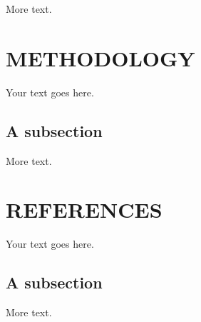 \documentclass[11pt]{article} %
\begin{document}
More text.
\section{METHODOLOGY}

Your text goes here.

\subsection{A subsection}

More text.
\section{REFERENCES}

Your text goes here.

\subsection{A subsection}

More text.
\end{document}
